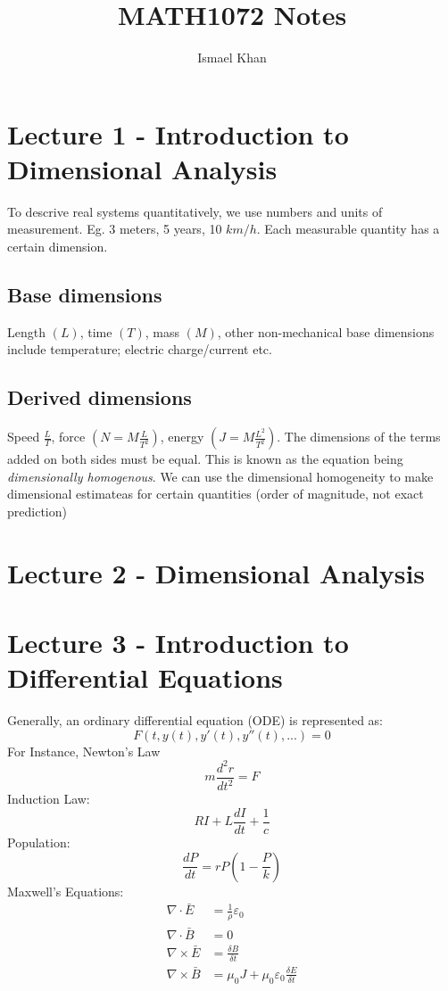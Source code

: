 \documentclass[a6paper]{article}
\title{MATH1072 Notes}
\author{Ismael Khan}
\theoremstyle{definition}
\theoremstyle{plain}
\theoremstyle{remark}
\begin{document}
	\maketitle
	\section{Lecture 1 - Introduction to Dimensional Analysis}
	To descrive real systems quantitatively, we use numbers and units of
	measurement. Eg. 3 meters, 5 years, 10 $ km/h $.
	Each measurable quantity has a certain dimension.
	\subsection{Base dimensions}
	Length $ (L) $, time $ (T) $, mass $ (M) $, other non-mechanical base
	dimensions include temperature; electric charge/current etc.
	\subsection{Derived dimensions}
	Speed $ \displaystyle \frac{L}{T} $, force $ (
	N = M \displaystyle \frac{L}{T^2}) $, energy $ (J = M \displaystyle
	\frac{L^2}{T^2}) $. The dimensions of the terms added on both sides
	must be equal. This is known as the equation being
	\textit{dimensionally homogenous}. We can use the dimensional
	homogeneity to make dimensional estimateas for certain quantities
	(order of magnitude, not exact prediction)
	\section{Lecture 2 - Dimensional Analysis}
	\section{Lecture 3 - Introduction to Differential Equations}
	\noindent Generally, an ordinary differential equation (ODE) is represented as:
	$$ F(t,y(t), y'(t), y''(t), ...)  = 0 $$
	For Instance, Newton's Law
	$$ m \frac{d^2 r}{dt^2} = F $$
	Induction Law:
	$$ RI + L \frac{dI}{dt} + \frac{1}{c} $$
	Population:
	$$ \frac{dP}{dt} = rP(1- \frac{P}{k})$$
	Maxwell's Equations:
	\begin{align*}
		\nabla \cdot \bar{E} &= \frac{1}{\rho} \varepsilon_0 \\
		\nabla \cdot \bar{B} &= 0 \\
		\nabla \times \bar{E} &= \frac{\delta B}{\delta t} \\
		\nabla \times \bar{B} &= \mu_0 J + \mu_0 \varepsilon_0 \frac{\delta E}{\delta t}
	\end{align*}
\end{document}
